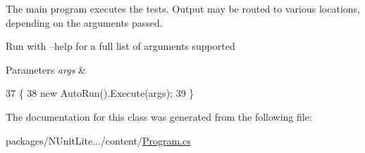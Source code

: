 The main program executes the tests. Output may be routed to various locations, depending on the arguments passed. 

Run with --help for a full list of arguments supported


\begin{DoxyParams}{Parameters}
{\em args} & \\
\hline
\end{DoxyParams}

\begin{DoxyCode}
37         \{
38             \textcolor{keyword}{new} AutoRun().Execute(args);
39         \}
\end{DoxyCode}


The documentation for this class was generated from the following file\-:\begin{DoxyCompactItemize}
\item 
packages/\-N\-Unit\-Lite.../content/\hyperlink{a00124}{Program.\-cs}\end{DoxyCompactItemize}
